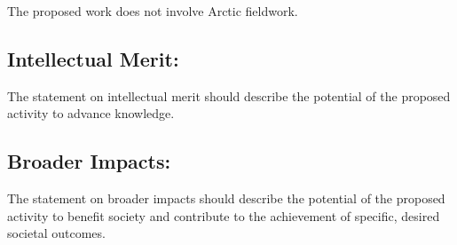 The proposed work does not involve Arctic fieldwork.




\vspace{-8pt}
\subsection*{Intellectual Merit:}
\vspace{-7pt}

The statement on intellectual merit should describe the potential of the proposed activity to advance knowledge.




\vspace{-8pt}
\subsection*{Broader Impacts:} 
\vspace{-7pt}

The statement on broader impacts should describe the potential of the proposed activity to benefit society and contribute to the achievement of specific, desired societal outcomes.